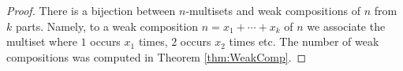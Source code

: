 

\setcounter{section}{4}
\setcounter{subsection}{0}
\setcounter{dfn}{15}

\begin{proof}
There is a bijection between $n$-multisets and weak compositions of $n$ from $k$ parts.
Namely, to a weak composition $n = x_1 + \cdots + x_k$ of $n$ we associate the multiset
where $1$ occurs $x_1$ times, $2$ occurs $x_2$ times etc.
The number of weak compositions was computed in Theorem \ref{thm:WeakComp}.
\end{proof}



